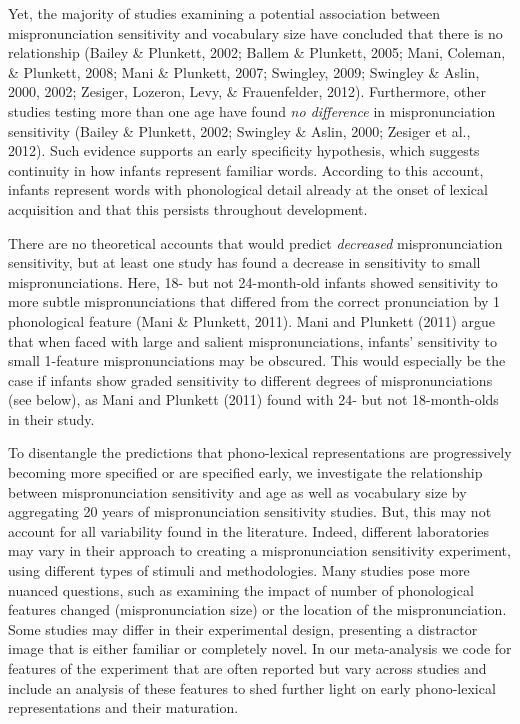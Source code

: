 \documentclass[
  english,
  man, noextraspace]{apa6}
\begin{document}
Yet, the majority of studies examining a potential association between mispronunciation sensitivity and vocabulary size have concluded that there is no relationship (Bailey \& Plunkett, 2002; Ballem \& Plunkett, 2005; Mani, Coleman, \& Plunkett, 2008; Mani \& Plunkett, 2007; Swingley, 2009; Swingley \& Aslin, 2000, 2002; Zesiger, Lozeron, Levy, \& Frauenfelder, 2012). Furthermore, other studies testing more than one age have found \emph{no difference} in mispronunciation sensitivity (Bailey \& Plunkett, 2002; Swingley \& Aslin, 2000; Zesiger et al., 2012). Such evidence supports an early specificity hypothesis, which suggests continuity in how infants represent familiar words. According to this account, infants represent words with phonological detail already at the onset of lexical acquisition and that this persists throughout development.

There are no theoretical accounts that would predict \emph{decreased} mispronunciation sensitivity, but at least one study has found a decrease in sensitivity to small mispronunciations. Here, 18- but not 24-month-old infants showed sensitivity to more subtle mispronunciations that differed from the correct pronunciation by 1 phonological feature (Mani \& Plunkett, 2011). Mani and Plunkett (2011) argue that when faced with large and salient mispronunciations, infants' sensitivity to small 1-feature mispronunciations may be obscured. This would especially be the case if infants show graded sensitivity to different degrees of mispronunciations (see below), as Mani and Plunkett (2011) found with 24- but not 18-month-olds in their study.

To disentangle the predictions that phono-lexical representations are progressively becoming more specified or are specified early, we investigate the relationship between mispronunciation sensitivity and age as well as vocabulary size by aggregating 20 years of mispronunciation sensitivity studies. But, this may not account for all variability found in the literature. Indeed, different laboratories may vary in their approach to creating a mispronunciation sensitivity experiment, using different types of stimuli and methodologies. Many studies pose more nuanced questions, such as examining the impact of number of phonological features changed (mispronunciation size) or the location of the mispronunciation. Some studies may differ in their experimental design, presenting a distractor image that is either familiar or completely novel. In our meta-analysis we code for features of the experiment that are often reported but vary across studies and include an analysis of these features to shed further light on early phono-lexical representations and their maturation.
\end{document}
